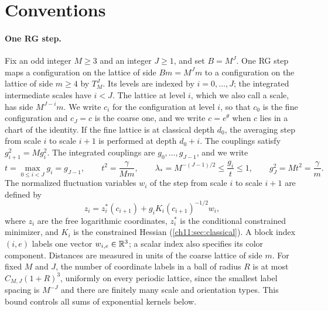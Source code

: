 \section{Conventions}\label{ch11:sec:conventions}

\paragraph{One RG step.}
Fix an odd integer $M\ge3$ and an integer $J\ge1$, and set $B=M^J$. One RG step maps a configuration on the lattice of side $Bm=M^Jm$ to a configuration on the lattice of side $m\ge4$ by $T_M^J$. Its levels are indexed by $i=0,\dots,J$; the integrated intermediate scales have $i<J$. The lattice at level $i$, which we also call a scale, has side $M^{J-i}m$. We write $c_i$ for the configuration at level $i$, so that $c_0$ is the fine configuration and $c_J=c$ is the coarse one, and we write $c=e^\theta$ when $c$ lies in a chart of the identity. If the fine lattice is at classical depth $d_0$, the averaging step from scale $i$ to scale $i+1$ is performed at depth $d_0+i$. The couplings satisfy $g_{i+1}^2=Mg_i^2$. The integrated couplings are $g_0,\dots,g_{J-1}$, and we write
\[
 t=\max_{0\le i<J}g_i=g_{J-1},\qquad t^2=\frac{\gamma}{Mm},\qquad
 \lambda_*=M^{-(J-1)/2}\le\frac{g_i}{t}\le1,\qquad g_J^2=Mt^2=\frac\gamma m.
\]
The normalized fluctuation variables $w_i$ of the step from scale $i$ to scale $i+1$ are defined by
\[
 z_i=z_i^*(c_{i+1})+g_iK_i(c_{i+1})^{-1/2}w_i,
\]
where $z_i$ are the free logarithmic coordinates, $z_i^*$ is the conditional constrained minimizer, and $K_i$ is the constrained Hessian (\cref{ch11:sec:classical}). A block index $(i,e)$ labels one vector $w_{i,e}\in\mathbb R^3$; a scalar index also specifies its color component. Distances are measured in units of the coarse lattice of side $m$. For fixed $M$ and $J$, the number of coordinate labels in a ball of radius $R$ is at most $C_{M,J}(1+R)^3$, uniformly on every periodic lattice, since the smallest label spacing is $M^{-J}$ and there are finitely many scale and orientation types. This bound controls all sums of exponential kernels below.

